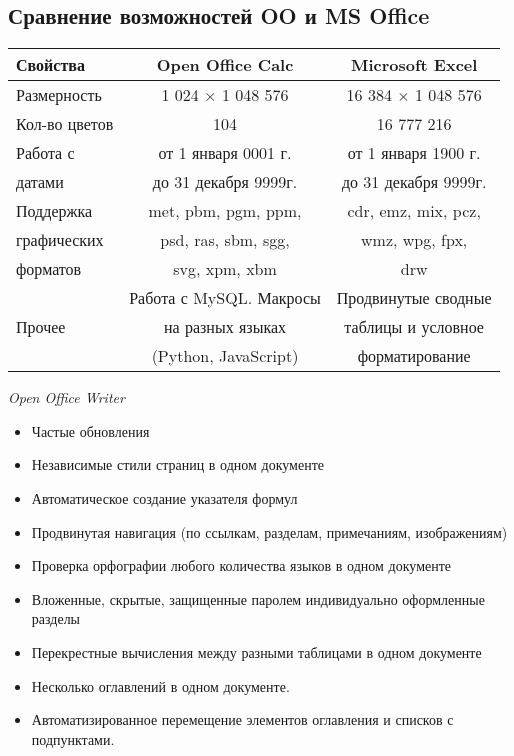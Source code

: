 \subsection{Сравнение возможностей OO и MS Office}
\begin{table}[!h]
 \begin{tabular}{|l|c|c|}
 \hline
 Свойства & Open Office Calc & Microsoft Excel \\
 \hline
 Размерность & 1 024 $\times$ 1 048 576  & 16 384 $\times$ 1 048 576 \\
 \hline
 Кол-во цветов & 104 & 16 777 216 \\
  \hline
 Работа с & от 1 января 0001 г. & от 1 января 1900 г. \\
 датами & до 31 декабря 9999г. & до 31 декабря 9999г. \\
 \hline
 Поддержка  & met, pbm, pgm, ppm,  & cdr, emz, mix, pcz, \\
 графических & psd, ras, sbm, sgg, &  wmz, wpg, fpx,  \\
 форматов & svg, xpm, xbm &  drw \\
 \hline
 & Работа с MySQL. Макросы & Продвинутые сводные  \\
 Прочее & на разных языках & таблицы и условное \\
 & (Python, JavaScript) & форматирование  \\
  \hline
 \end{tabular}

\end{table}
\begin{center}
  \emph{Open Office Writer}
\end{center}
\begin{itemize}
  \item Частые обновления
  \item Независимые стили страниц в одном документе
  \item Автоматическое создание указателя формул
  \item Продвинутая навигация (по ссылкам, разделам, примечаниям, изображениям)
  \item Проверка орфографии любого количества языков в одном документе
  \item Вложенные, скрытые, защищенные паролем индивидуально оформленные разделы
  \item Перекрестные вычисления между разными таблицами в одном документе
  \item Несколько оглавлений в одном документе.
  \item Автоматизированное перемещение элементов оглавления и списков с подпунктами.
\end{itemize}
